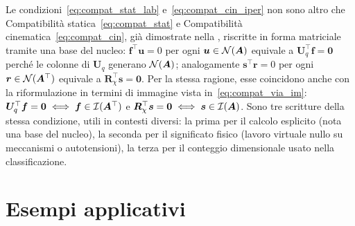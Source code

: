 \begin{oss}
	Le condizioni~\eqref{eq:compat_stat_lab} e~\eqref{eq:compat_cin_iper}
	non sono altro che Compatibilità statica~\eqref{eq:compat_stat} e
	Compatibilità cinematica~\eqref{eq:compat_cin}, già dimostrate nella
	, riscritte in forma matriciale tramite una
	base del nucleo: $\bm f^\top\bm u=0$ per ogni $\bm u\in\mathcal{N}(\bm A)$
	equivale a $\bm U_q^\top\bm f=\bm 0$ perché le colonne di $\bm U_q$
	generano $\mathcal{N}(\bm A)$; analogamente $\bm s^\top\bm r=0$ per ogni
	$\bm r\in\mathcal{N}(\bm A^\top)$ equivale a $\bm R_\chi^\top\bm s=\bm 0$.
	Per la stessa ragione, esse coincidono anche con la riformulazione
	in termini di immagine vista in~\eqref{eq:compat_via_im}:
	$\bm U_q^\top\bm f=\bm 0 \iff \bm f\in\mathcal{I}(\bm A^\top)$ e
	$\bm R_\chi^\top\bm s=\bm 0 \iff \bm s\in\mathcal{I}(\bm A)$. Sono tre
	scritture della stessa condizione, utili in contesti diversi: la
	prima per il calcolo esplicito (nota una base del nucleo), la
	seconda per il significato fisico (lavoro virtuale nullo su
	meccanismi o autotensioni), la terza per il conteggio dimensionale
	usato nella classificazione.
\end{oss}










\section{Esempi applicativi}\label{sec:esempi}




